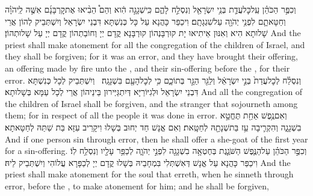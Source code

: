 {וְכִפֶּ֣ר הַכֹּהֵ֗ן עַֽל\maqqaf כׇּל\maqqaf עֲדַ֛ת בְּנֵ֥י יִשְׂרָאֵ֖ל וְנִסְלַ֣ח לָהֶ֑ם כִּֽי\maqqaf שְׁגָגָ֣ה הִ֔וא וְהֵם֩ הֵבִ֨יאוּ אֶת\maqqaf קׇרְבָּנָ֜ם אִשֶּׁ֣ה לַֽיהֹוָ֗ה וְחַטָּאתָ֛ם לִפְנֵ֥י יְהֹוָ֖ה עַל\maqqaf שִׁגְגָתָֽם׃}
{וִיכַפַּר כָּהֲנָא עַל כָּל כְּנִשְׁתָּא דִּבְנֵי יִשְׂרָאֵל וְיִשְׁתְּבֵיק לְהוֹן אֲרֵי שָׁלוּתָא הִיא וְאִנּוּן אֵיתִיאוּ יָת קוּרְבָּנְהוֹן קוּרְבָּנָא קֳדָם יְיָ וְחוֹבַתְהוֹן קֳדָם יְיָ עַל שָׁלוּתְהוֹן׃}
{And the priest shall make atonement for all the congregation of the children of Israel, and they shall be forgiven; for it was an error, and they have brought their offering, an offering made by fire unto the \lord, and their sin-offering before the \lord, for their error.}{}
{וְנִסְלַ֗ח לְכׇל\maqqaf עֲדַת֙ בְּנֵ֣י יִשְׂרָאֵ֔ל וְלַגֵּ֖ר הַגָּ֣ר בְּתוֹכָ֑ם כִּ֥י לְכׇל\maqqaf הָעָ֖ם בִּשְׁגָגָֽה׃ \setuma }
{וְיִשְׁתְּבֵיק לְכָל כְּנִשְׁתָּא דִּבְנֵי יִשְׂרָאֵל וּלְגִיּוֹרַיָּא דְּיִתְגַּיְּירוּן בֵּינֵיהוֹן אֲרֵי לְכָל עַמָּא בְּשָׁלוּתָא׃}
{And all the congregation of the children of Israel shall be forgiven, and the stranger that sojourneth among them; for in respect of all the people it was done in error.}{}
{וְאִם\maqqaf נֶ֥פֶשׁ אַחַ֖ת תֶּחֱטָ֣א בִשְׁגָגָ֑ה וְהִקְרִ֛יבָה עֵ֥ז בַּת\maqqaf שְׁנָתָ֖הּ לְחַטָּֽאת׃}
{וְאִם אֱנָשׁ חַד יְחוּב בְּשָׁלוּ וִיקָרֵיב עִזָּא בַּת שַׁתַּהּ לְחַטָּאתָא׃}
{And if one person sin through error, then he shall offer a she-goat of the first year for a sin-offering.}{}
{וְכִפֶּ֣ר הַכֹּהֵ֗ן עַל\maqqaf הַנֶּ֧פֶשׁ הַשֹּׁגֶ֛גֶת בְּחֶטְאָ֥ה בִשְׁגָגָ֖ה לִפְנֵ֣י יְהֹוָ֑ה לְכַפֵּ֥ר עָלָ֖יו וְנִסְלַ֥ח לֽוֹ׃}
{וִיכַפַּר כָּהֲנָא עַל אֱנָשׁ דְּאִשְׁתְּלִי בִּמְחָבֵיהּ בְּשָׁלוּ קֳדָם יְיָ לְכַפָּרָא עֲלוֹהִי וְיִשְׁתְּבֵיק לֵיהּ׃}
{And the priest shall make atonement for the soul that erreth, when he sinneth through error, before the \lord, to make atonement for him; and he shall be forgiven,}{}
